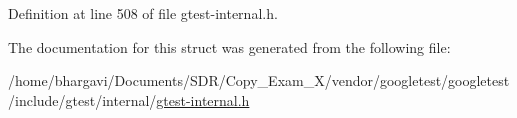 Definition at line 508 of file gtest-\/internal.\+h.



The documentation for this struct was generated from the following file\+:\begin{DoxyCompactItemize}
\item 
/home/bhargavi/\+Documents/\+S\+D\+R/\+Copy\+\_\+\+Exam\+\_\+X/vendor/googletest/googletest/include/gtest/internal/\hyperlink{gtest-internal_8h}{gtest-\/internal.\+h}\end{DoxyCompactItemize}
